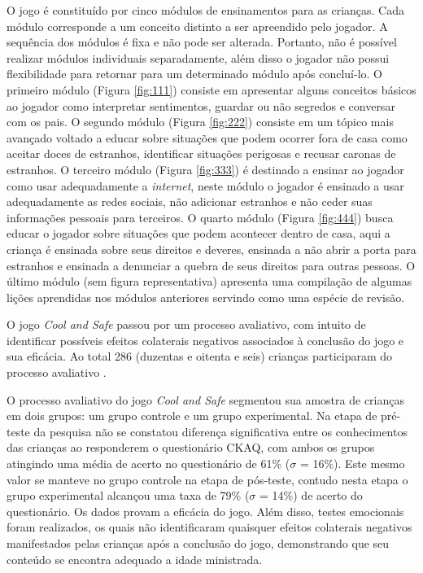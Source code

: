 O jogo é constituído por cinco módulos de ensinamentos para as crianças. Cada módulo corresponde a um conceito distinto a ser apreendido pelo jogador. A sequência dos módulos é fixa e não pode ser alterada. Portanto, não é possível realizar módulos individuais separadamente, além disso o jogador não possui flexibilidade para retornar para um determinado módulo após concluí-lo. O primeiro módulo (Figura \ref{fig:111}) consiste em apresentar alguns conceitos básicos ao jogador como interpretar sentimentos, guardar ou não segredos e conversar com os pais. O segundo módulo (Figura \ref{fig:222}) consiste em um tópico mais avançado voltado a educar sobre situações que podem ocorrer fora de casa como aceitar doces de estranhos, identificar situações perigosas e recusar caronas de estranhos. O terceiro módulo (Figura \ref{fig:333}) é destinado a ensinar ao jogador como usar adequadamente a \textit{internet}, neste módulo o jogador é ensinado a usar adequadamente as redes sociais, não adicionar estranhos e não ceder suas informações pessoais para terceiros. O quarto módulo (Figura \ref{fig:444}) busca educar o jogador sobre situações que podem acontecer dentro de casa, aqui a criança é ensinada sobre seus direitos e deveres, ensinada a não abrir a porta para estranhos e ensinada a denunciar a quebra de seus direitos para outras pessoas. O último módulo (sem figura representativa) apresenta uma compilação de algumas lições aprendidas nos módulos anteriores servindo como uma espécie de revisão. 

O jogo \textit{Cool and Safe} passou por um processo avaliativo, com intuito de identificar possíveis efeitos colaterais negativos associados à conclusão do jogo e sua eficácia. Ao total 286 (duzentas e oitenta e seis) crianças participaram do processo avaliativo \cite{muller2014child}. 

O processo avaliativo do jogo \textit{Cool and Safe} segmentou sua amostra de crianças em dois grupos: um grupo controle e um grupo experimental. Na etapa de pré-teste da pesquisa não se constatou diferença significativa entre os conhecimentos das crianças ao responderem o questionário \ac{CKAQ}, com ambos os grupos atingindo uma média de acerto no questionário de 61\% ($\sigma$ = 16\%). Este mesmo valor se manteve no grupo controle na etapa de pós-teste, contudo nesta etapa o grupo experimental alcançou uma taxa de 79\% ($\sigma$ = 14\%) de acerto do questionário. Os dados provam a eficácia do jogo. Além disso, testes emocionais foram realizados, os quais não identificaram quaisquer efeitos colaterais negativos manifestados pelas crianças após a conclusão do jogo, demonstrando que seu conteúdo se encontra adequado a idade ministrada. 


